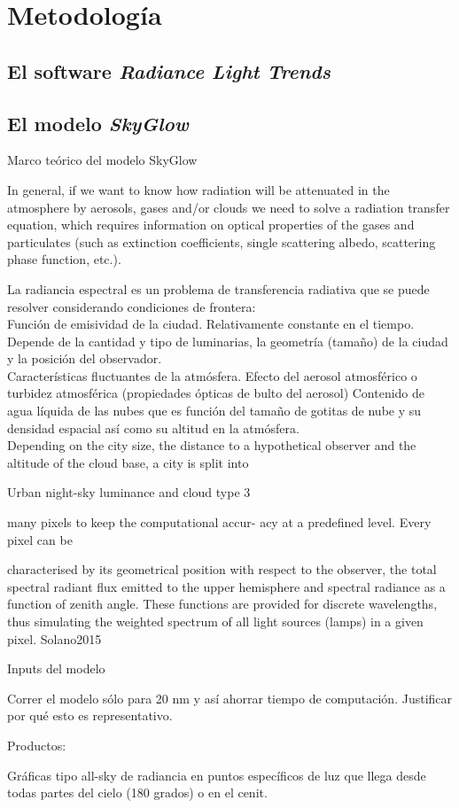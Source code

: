 \chapter{Metodología}

\section{El software \textit{Radiance Light Trends}}

\section{El modelo \textit{SkyGlow}}

Marco teórico del modelo SkyGlow



In general, if we want to know how radiation will be attenuated in the
atmosphere by aerosols, gases and/or clouds we need to solve a radiation
transfer equation, which requires information on optical properties of the
gases and particulates (such as extinction coefficients, single scattering
albedo, scattering phase function, etc.). 

La radiancia espectral es un problema de transferencia radiativa que se puede resolver considerando condiciones de frontera:\\


Función de emisividad de la ciudad. Relativamente constante en el tiempo. Depende de la cantidad y tipo de luminarias, la geometría (tamaño) de la ciudad y la posición del observador.\\

Características fluctuantes de la atmósfera. 
Efecto del aerosol atmosférico o turbidez atmosférica (propiedades ópticas de bulto del aerosol)
Contenido de agua líquida de las nubes que es función del tamaño de gotitas de nube y su densidad espacial así como su altitud en la atmósfera.\\

Depending on the city size, the
distance to a hypothetical observer and the
altitude of the cloud base, a city is split into

Urban night-sky luminance and cloud type 3

many pixels to keep the computational accur-
acy at a predefined level. Every pixel can be

characterised by its geometrical position with
respect to the observer, the total spectral
radiant flux emitted to the upper hemisphere
and spectral radiance as a function of zenith
angle. These functions are provided for
discrete wavelengths, thus simulating the
weighted spectrum of all light sources
(lamps) in a given pixel. Solano2015

Inputs del modelo

Correr el modelo sólo para 20 nm y así ahorrar tiempo de computación. Justificar por qué esto es representativo.

Productos:

Gráficas tipo all-sky de radiancia en puntos específicos de luz que llega desde todas partes del cielo (180 grados) o en el cenit.\\